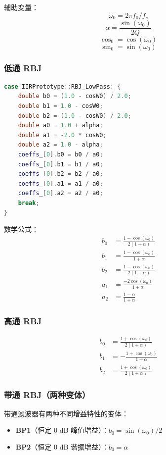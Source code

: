 ﻿\documentclass[12pt,a4paper,oneside]{ctexbook}
\begin{document}
辅助变量：
\[
\omega_0 = 2\pi f_0 / f_s
\]
\[
\alpha = \frac{\sin(\omega_0)}{2Q}
\]
\[
\cos_0 = \cos(\omega_0)
\]
\[
\sin_0 = \sin(\omega_0)
\]

\subsubsection{低通 RBJ}

\begin{lstlisting}[language=C++, caption={RBJ 低通滤波器系数}]
case IIRPrototype::RBJ_LowPass: {
    double b0 = (1.0 - cosW0) / 2.0;
    double b1 = 1.0 - cosW0;
    double b2 = (1.0 - cosW0) / 2.0;
    double a0 = 1.0 + alpha;
    double a1 = -2.0 * cosW0;
    double a2 = 1.0 - alpha;
    coeffs_[0].b0 = b0 / a0;
    coeffs_[0].b1 = b1 / a0;
    coeffs_[0].b2 = b2 / a0;
    coeffs_[0].a1 = a1 / a0;
    coeffs_[0].a2 = a2 / a0;
    break;
}
\end{lstlisting}

数学公式：
\[
\begin{aligned}
b_0 &= \frac{1 - \cos(\omega_0)}{2(1 + \alpha)} \\
b_1 &= \frac{1 - \cos(\omega_0)}{1 + \alpha} \\
b_2 &= \frac{1 - \cos(\omega_0)}{2(1 + \alpha)} \\
a_1 &= \frac{-2\cos(\omega_0)}{1 + \alpha} \\
a_2 &= \frac{1 - \alpha}{1 + \alpha}
\end{aligned}
\]

\subsubsection{高通 RBJ}

\[
\begin{aligned}
b_0 &= \frac{1 + \cos(\omega_0)}{2(1 + \alpha)} \\
b_1 &= -\frac{1 + \cos(\omega_0)}{1 + \alpha} \\
b_2 &= \frac{1 + \cos(\omega_0)}{2(1 + \alpha)}
\end{aligned}
\]

\subsubsection{带通 RBJ（两种变体）}

带通滤波器有两种不同增益特性的变体：
\begin{itemize}
    \item \textbf{BP1}（恒定 0 dB 峰值增益）：\(b_0 = \sin(\omega_0) / 2\)
    \item \textbf{BP2}（恒定 0 dB 谐振增益）：\(b_0 = \alpha\)
\end{itemize}
\end{document}
